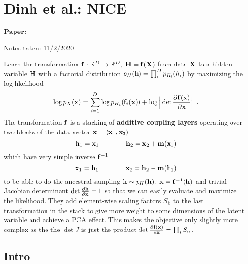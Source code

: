 \clearpage

\section{Dinh et al.: NICE}\label{sec:Nice}

\begin{notebox}
\textbf{Paper: } 

\hfill Notes taken: 11/2/2020 
\end{notebox}

\begin{notebox}
\tldr Learn the transformation $\mathbf{f} : \mathbb{R}^D \to \mathbb{R}^D, \ \mathbf{H} = \mathbf{f}(\mathbf{X})$ from data $\mathbf{X}$ to a hidden variable $\mathbf{H}$ with a factorial distribution $p_H(\mathbf{h}) = \prod_i^D p_{H_i}(h_i)$ by maximizing the log likelihood
\begin{equation}
\log p_X(\mathbf{x}) = \sum_{i=1}^D \log p_{H_i}(\mathbf{f}_i(\mathbf{x})) + \log \Big\lvert \det \frac{\partial \mathbf{f}(\mathbf{x})}{\partial \mathbf{x}} \Big\rvert \enspace .
\end{equation}
The transformation $\mathbf{f}$ is a stacking of \textbf{additive coupling layers} operating over two blocks of the data vector $\mathbf{x} = (\mathbf{x}_1, \mathbf{x}_2)$
\begin{equation}
\mathbf{h}_1 = \mathbf{x}_1 \qquad \qquad \mathbf{h}_2 = \mathbf{x}_2 + \mathbf{m}(\mathbf{x}_1)
\end{equation}
which have very simple inverse $\mathbf{f}^{-1}$
\begin{equation}
\mathbf{x}_1 = \mathbf{h}_1 \qquad \qquad \mathbf{x}_2 = \mathbf{h}_2 - \mathbf{m}(\mathbf{h}_1)
\end{equation}
to be able to do the ancestral sampling $\mathbf{h} \sim p_{H}(\mathbf{h}), \ \mathbf{x} = \mathbf{f}^{-1}(\mathbf{h})$
and trivial Jacobian determinant
$\det \frac{\partial \mathbf{h}}{\partial \mathbf{x}} = 1$
so that we can easily evaluate and maximize the likelihood.
They add element-wise scaling factors $S_{ii}$ to the last transformation in the stack to give more weight to some dimensions of the latent variable and achieve a PCA effect.
This makes the objective only slightly more complex as the the $\det J$ is just the product $\det \frac{\partial \mathbf{f}(\mathbf{x})}{\partial \mathbf{x}} = \prod_i S_{ii}$.
\end{notebox}

\subsection{Intro}


